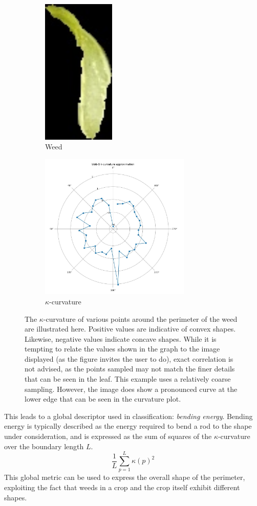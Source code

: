 \documentclass[letterpaper, notitlepage]{report}
\begin{document}
{  \begin{figure}[h!]
	\centering
	\begin{subfigure}[h]{.4\textwidth}
	  \centering
	  \includegraphics[height=7cm]{./figures/for-curvature-blob-1.jpg}
	  \caption{Weed}
	  \label{fig:curvature-weed}
	\end{subfigure}
	\begin{subfigure}[h]{.4\textwidth}
	  \centering
	  \includegraphics[height=7cm]{./figures/curvature-blob-1.jpg}
	  \caption{$\kappa$-curvature}
	  \label{fig:curvature-plot}
	\end{subfigure}
	\caption[Example of $\kappa$-curvature]{The $\kappa$-curvature of various points around the perimeter of the weed are illustrated here. Positive values are indicative of convex shapes. Likewise, negative values indicate concave shapes.  While it is tempting to relate the values shown in the graph to the image displayed (as the figure invites the user to do), exact correlation is not advised, as the points sampled may not match the finer details that can be seen in the leaf. This example uses a relatively coarse sampling. However, the image does show a pronounced curve at the lower edge that can be seen in the curvature plot.}
	\label{fig:curvature}
\end{figure}
This leads to a global descriptor used in classification: \textit{bending energy}. Bending energy is typically described as the energy required to bend a rod to the shape under consideration, and is expressed as the sum of squares of the $\kappa$-curvature over the boundary length $L$.
\begin{equation}
\frac{1}{L} \sum_{p=1}^{L}\kappa(p)^2
\end{equation}
This global metric can be used to express the overall shape of the perimeter, exploiting the fact that weeds in a crop and the crop itself exhibit different shapes.

}
\end{document}

